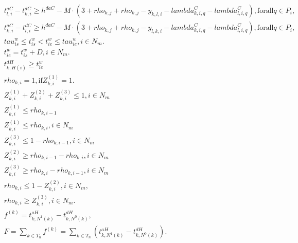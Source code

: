\begin{align}
  & t_{l , i}^{a C} - t_{k , i}^{d C} \geq h^{d a C} - M \cdot \left(3 + \mathit{rho}_{k , j} + \mathit{rho}_{k , j} - y_{k , l , i} - \mathit{lambda}_{k , i , q}^{C} - \mathit{lambda}_{l , i , q}^{C}\right) , \text{for} \text{all} q \in P_{i} , \tag{eq\_0030} \\
  & t_{k , i}^{a C} - t_{l , i}^{d C} \geq h^{d a C} - M \cdot \left(3 + \mathit{rho}_{k , j} + \mathit{rho}_{k , j} - y_{l , k , i} - \mathit{lambda}_{k , i , q}^{C} - \mathit{lambda}_{l , i , q}^{C}\right) , \text{for} \text{all} q \in P_{i} , \tag{eq\_0031} \\
  & \mathit{tau}_{i s}^{w} \leq t_{i s}^{w} < t_{i e}^{w} \leq \mathit{tau}_{i e}^{w} , i \in N_{m} . \tag{eq\_0032} \\
  & t_{i e}^{w} = t_{i s}^{w} + D , i \in N_{m} . \tag{eq\_0033} \\
  & t_{k , H \left(i\right)}^{d H} \geq t_{i e}^{w} \tag{eq\_0036\_a} \\
  & \mathit{rho}_{k , i} = 1 , \text{if} Z_{k , i}^{\left(1\right)} = 1 . \tag{eq\_0036\_b} \\
  & Z_{k , i}^{\left(1\right)} + Z_{k , i}^{\left(2\right)} + Z_{k , i}^{\left(3\right)} \leq 1 , i \in N_{m} \tag{eq\_0038} \\
  & Z_{k , i}^{\left(1\right)} \leq \mathit{rho}_{k , i - 1} \tag{eq\_0039\_a} \\
  & Z_{k , i}^{\left(1\right)} \leq \mathit{rho}_{k , i} , i \in N_{m} \tag{eq\_0039\_b} \\
  & Z_{k , i}^{\left(3\right)} \leq 1 - \mathit{rho}_{k , i - 1} , i \in N_{m} \tag{eq\_0040} \\
  & Z_{k , i}^{\left(2\right)} \geq \mathit{rho}_{k , i - 1} - \mathit{rho}_{k , i} , i \in N_{m} \tag{eq\_0041} \\
  & Z_{k , i}^{\left(3\right)} \geq \mathit{rho}_{k , i} - \mathit{rho}_{k , i - 1} , i \in N_{m} \tag{eq\_0042} \\
  & \mathit{rho}_{k , i} \leq 1 - Z_{k , i}^{\left(2\right)} , i \in N_{m} , \tag{eq\_0043} \\
  & \mathit{rho}_{k , i} \geq Z_{k , i}^{\left(3\right)} , i \in N_{m} . \tag{eq\_0044} \\
  & f^{\left(k\right)} = t_{k , N^{1} \left(k\right)}^{a H} - t_{k , N^{0} \left(k\right)}^{d H} , \tag{eq\_0045} \\
  & F = \sum_{k \in T_{n}} f^{\left(k\right)} = \sum_{k \in T_{n}} \left(t_{k , N^{1} \left(k\right)}^{a H} - t_{k , N^{0} \left(k\right)}^{d H}\right) . \tag{eq\_0046} \\

\end{align}

